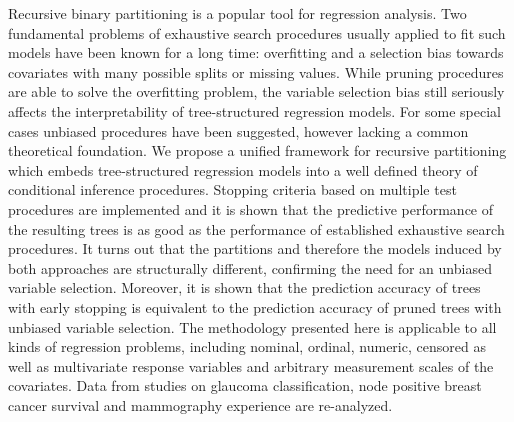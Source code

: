 
Recursive binary partitioning is a popular tool for %
regression analysis. Two fundamental problems of exhaustive
search procedures usually applied to fit such models
have been known for a long time: overfitting and a selection bias towards
covariates with many possible splits or missing values. While pruning
procedures are able to solve the overfitting problem, the variable selection
bias still seriously affects the interpretability of tree-structured 
regression models. For some special cases unbiased procedures have been suggested,
however lacking a common theoretical foundation. We propose a unified
framework for recursive partitioning which embeds tree-structured regression
models into a well defined theory of conditional inference procedures.
Stopping criteria based on multiple test procedures are implemented and it is
shown that the predictive performance of the resulting trees is as good as
the performance of established exhaustive search procedures. It turns out
that the partitions and therefore the models induced by both approaches are
structurally different, confirming the need for an unbiased variable
selection. Moreover, it is shown that the prediction accuracy of trees with
early stopping is equivalent to the prediction accuracy of 
pruned trees with unbiased variable selection.
The methodology presented here is applicable to all kinds of regression
problems, including nominal, ordinal, numeric, censored as well as
multivariate response variables and arbitrary measurement scales of the
covariates. Data from studies on glaucoma classification,
node positive breast cancer survival and mammography experience are re-analyzed.
